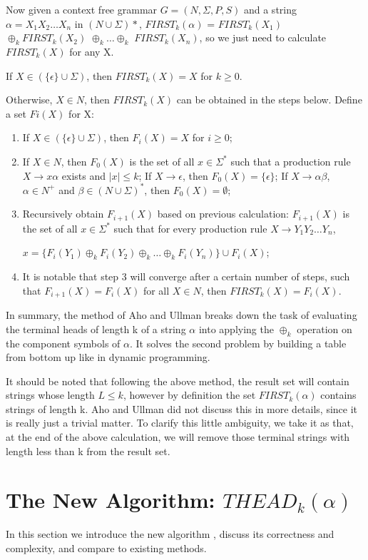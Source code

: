\documentclass{sig-alternate-05-2015}
\begin{document}
Now given a context free grammar $G = (N, \Sigma, P, S)$ and
a string $ \alpha = X_1X_2…X_n$ in $(N \cup \Sigma)*$, 
$FIRST_k(\alpha)$ =
$FIRST_k(X_1)$ $\oplus_k FIRST_k(X_2)$ $\oplus_k \ldots \oplus_k$ $FIRST_k(X_n)$, 
so we
just need to calculate $FIRST_k(X)$ for any X.

If $X \in (\{\epsilon\} \cup \Sigma)$, then $FIRST_k(X) = X$ for $k \geq 0$.

Otherwise, $X \in N$, then $FIRST_k(X)$ can be obtained in
the steps below. Define a set $Fi(X)$ for X:
\begin{enumerate}  
\item If $X \in (\{\epsilon\} \cup \Sigma)$, then $ F_i(X) = X $ for $i \geq 0$;
\item  
If $ X \in N $, then $ F_0(X) $ is the set of all $ x \in \Sigma^* $ such that a production
rule $ X \rightarrow x \alpha $ 
exists and $ \mid x \mid \leq k $; If $ X \rightarrow \epsilon$,
then $F_0(X) = \{\epsilon\}$; If $X\rightarrow \alpha\beta$, $\alpha \in N^+$ and 
$\beta \in (N \cup \Sigma)^*$, then $F_0(X) = \emptyset$;
\item
Recursively obtain $F_{i+1}(X)$ based on previous calculation:
$F_{i+1}(X)$ is the set of all $x \in \Sigma^*$ such that for every production
rule $X \rightarrow Y_1Y_2 \ldots Y_n$, 

$x = \{F_i(Y_1) \oplus_k F_i(Y_2) \oplus_k \ldots \oplus_k F_i(Y_n)\} \cup F_i(X)$;
\item
It is notable that step 3 will converge after a certain
number of steps, such that $F_{i+1}(X) = F_i(X)$ for all $X \in N$,
then $FIRST_k(X) = F_i(X)$.
\end{enumerate}

In summary, the method of Aho and Ullman breaks
down the task of evaluating the terminal heads of length k
of a string $\alpha$ into applying the $\oplus_k$ operation on the component
symbols of $\alpha$. It solves the second problem by building
a table from bottom up like in dynamic programming.

It should be noted that following the above method, the
result set will contain strings whose length $L \leq k$, however
by definition the set $FIRST_k(\alpha)$ contains strings of length k.
Aho and Ullman did not discuss this in more details, since
it is really just a trivial matter. To clarify this little ambiguity,
we take it as that, at the end of the above calculation, we
will remove those terminal strings with length less than k
from the result set.


\section{The New Algorithm: $THEAD_k(\alpha)$}
In this section we introduce the new algorithm \cite{pager08terminal}, discuss
its correctness and complexity, and compare to existing
methods.
\end{document}
